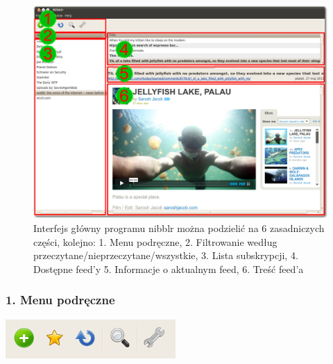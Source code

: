 \documentclass[a4paper,11pt]{report}
\begin{document}
\begin{figure}[h]
 \includegraphics[scale=0.27]{./img/nibblr1.png}
 \caption{Interfejs główny programu nibblr można podzielić na 6 zasadniczych
części, kolejno: 
\newline \hspace* {1,5cm}1. Menu podręczne, 
\newline \hspace* {1,5cm}2. Filtrowanie według
przeczytane/nieprzeczytane/wszystkie, 
\newline \hspace* {1,5cm}3. Lista subskrypcji, 
\newline \hspace* {1,5cm}4. Dostępne feed'y
\newline \hspace* {1,5cm}5. Informacje o aktualnym feed, 
\newline \hspace* {1,5cm}6. Treść feed'a
}
 \label{fig:interface6}
\end{figure}

\newpage
\subsubsection*{1. Menu podręczne}

\includegraphics[scale=0.8]{./img/menu.png}
\end{document}
